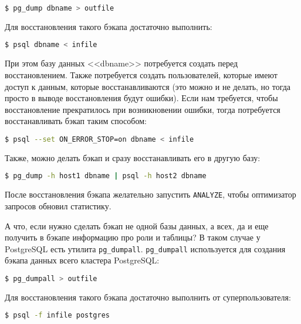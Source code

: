 \begin{lstlisting}[language=Bash,label=lst:backups1,caption=Создаем бэкап с помощью pg\_dump]
$ pg_dump dbname > outfile
\end{lstlisting}

Для восстановления такого бэкапа достаточно выполнить:

\begin{lstlisting}[language=Bash,label=lst:backups2,caption=Восстанавливаем бэкап]
$ psql dbname < infile
\end{lstlisting}

При этом базу данных <<dbname>> потребуется создать перед восстановлением. Также потребуется создать пользователей, которые имеют доступ к данным, которые восстанавливаются (это можно и не делать, но тогда просто в выводе восстановления будут ошибки). Если нам требуется, чтобы восстановление прекратилось при возникновении ошибки, тогда потребуется восстанавливать бэкап таким способом:

\begin{lstlisting}[language=Bash,label=lst:backups3,caption=Восстанавливаем бэкап]
$ psql --set ON_ERROR_STOP=on dbname < infile
\end{lstlisting}

Также, можно делать бэкап и сразу восстанавливать его в другую базу:

\begin{lstlisting}[language=Bash,label=lst:backups4,caption=Бекап в другую БД]
$ pg_dump -h host1 dbname | psql -h host2 dbname
\end{lstlisting}

После восстановления бэкапа желательно запустить \lstinline!ANALYZE!, чтобы оптимизатор запросов обновил статистику.

А что, если нужно сделать бэкап не одной базы данных, а всех, да и еще получить в бэкапе информацию про роли и таблицы? В таком случае у PostgreSQL есть утилита \lstinline!pg_dumpall!. \lstinline!pg_dumpall! используется для создания бэкапа данных всего кластера PostgreSQL:

\begin{lstlisting}[language=Bash,label=lst:backups5,caption=Бекап кластера PostgreSQL]
$ pg_dumpall > outfile
\end{lstlisting}

Для восстановления такого бэкапа достаточно выполнить от суперпользователя:

\begin{lstlisting}[language=Bash,label=lst:backups6,caption=Восстановления бэкапа PostgreSQL]
$ psql -f infile postgres
\end{lstlisting}


